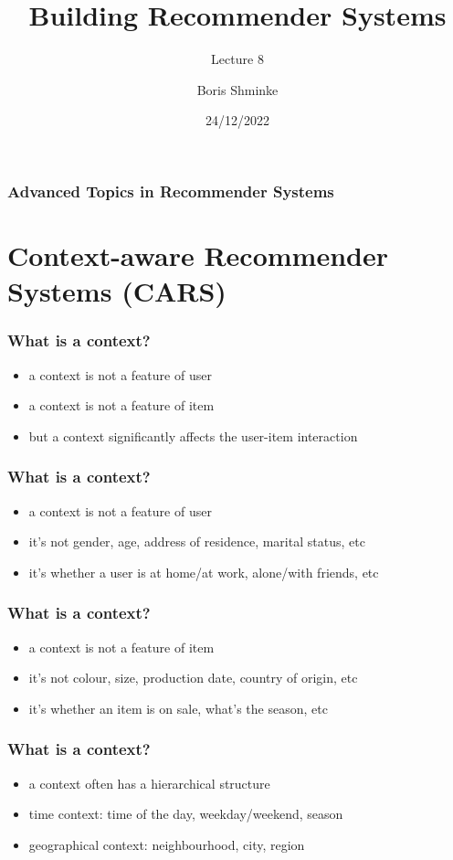 \documentclass[t]{beamer}
\title{Building Recommender Systems}
\subtitle{Lecture 8}
\author{Boris Shminke}
\institute{Université Côte d'Azur, CNRS, LJAD, France}
\date{24/12/2022}
\begin{document}
\begin{frame}
  \titlepage  
\end{frame}  
\begin{frame}
  \frametitle{Advanced Topics in Recommender Systems}
  \tableofcontents
\end{frame}
\section{Context-aware Recommender Systems (CARS)}
\begin{frame}
  \frametitle{What is a context?}
  \begin{itemize}
  \item a context is not a feature of user
  \item a context is not a feature of item
  \item but a context significantly affects the user-item interaction
  \end{itemize}
\end{frame}
\begin{frame}
  \frametitle{What is a context?}
  \begin{itemize}
  \item a context is not a feature of user
  \item it's not gender, age, address of residence, marital status, etc
  \item it's whether a user is at home/at work, alone/with friends, etc
  \end{itemize}
\end{frame}
\begin{frame}
  \frametitle{What is a context?}
  \begin{itemize}
  \item a context is not a feature of item
  \item it's not colour, size, production date, country of origin, etc
  \item it's whether an item is on sale, what's the season, etc
  \end{itemize}
\end{frame}
\begin{frame}
  \frametitle{What is a context?}
  \begin{itemize}
  \item a context often has a hierarchical structure
  \item time context: time of the day, weekday/weekend, season
  \item geographical context: neighbourhood, city, region
  \end{itemize}
\end{frame}
\end{document}
